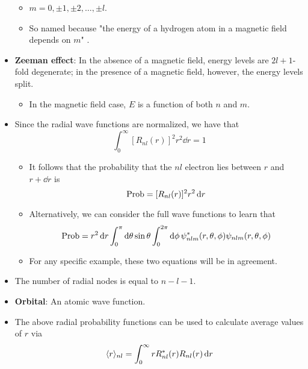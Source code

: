 \documentclass[../notes.tex]{subfiles}
\begin{document}
\begin{itemize}
    \begin{itemize}
        \item $m=0,\pm 1,\pm 2,\dots,\pm l$.
        \item So named because "the energy of a hydrogen atom in a magnetic field depends on $m$" \parencite[209]{bib:McQuarrieSimon}.
    \end{itemize}
    \item \textbf{Zeeman effect}: In the absence of a magnetic field, energy levels are $2l+1$-fold degenerate; in the presence of a magnetic field, however, the energy levels split.
    \begin{itemize}
        \item In the magnetic field case, $E$ is a function of both $n$ and $m$.
    \end{itemize}
    \item Since the radial wave functions are normalized, we have that
    \begin{equation*}
        \int_0^\infty[R_{nl}(r)]^2r^2\dd{r} = 1
    \end{equation*}
    \begin{itemize}
        \item It follows that the probability that the $nl$ electron lies between $r$ and $r+\dd{r}$ is
        \begin{equation*}
            \operatorname{Prob} = [R_{nl}(r)]^2r^2\dd{r}
        \end{equation*}
        \item Alternatively, we can consider the full wave functions to learn that
        \begin{equation*}
            \operatorname{Prob} = r^2\dd{r}\int_0^\pi\dd{\theta}\sin\theta\int_0^{2\pi}\dd{\phi}\psi_{nlm}^*(r,\theta,\phi)\psi_{nlm}(r,\theta,\phi)
        \end{equation*}
        \item For any specific example, these two equations will be in agreement.
    \end{itemize}
    \item The number of radial nodes is equal to $n-l-1$.
    \item \textbf{Orbital}: An atomic wave function.
    \item The above radial probability functions can be used to calculate average values of $r$ via
    \begin{equation*}
        \langle{r}\rangle_{nl} = \int_0^\infty rR_{nl}^*(r)R_{nl}(r)\dd{r}
    \end{equation*}
    \begin{itemize}

\end{itemize}
\end{itemize}
\end{document}
